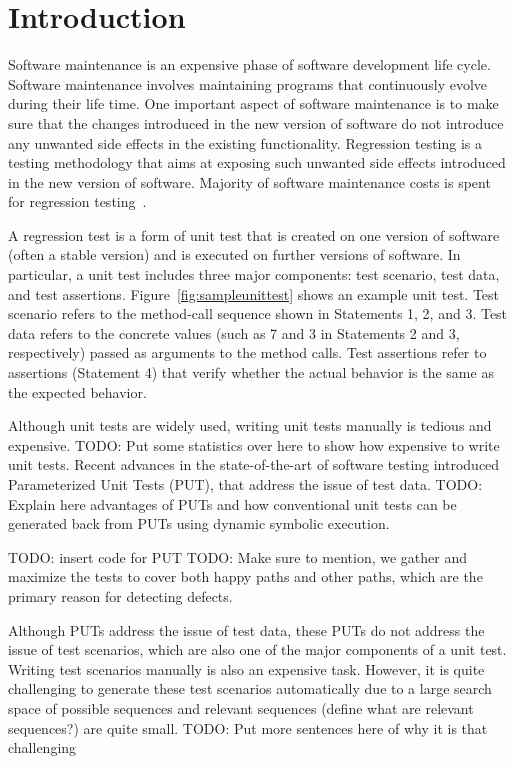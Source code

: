 \section{Introduction}
\label{sec:intro}

Software maintenance is an expensive phase of software development 
life cycle. Software maintenance involves maintaining programs that 
continuously evolve during their life time. One important aspect 
of software maintenance is to make sure that the changes introduced 
in the new version of software do not introduce any unwanted
side effects in the existing functionality. Regression testing is a testing 
methodology that aims at exposing such unwanted side effects introduced
in the new version of software. Majority of software
maintenance costs is spent for regression testing~\cite{}.

A regression test is a form of unit test that is created on one
version of software (often a stable version) and is executed 
on further versions of software. In particular, a unit test includes three 
major components: test scenario, test data, and test
assertions. Figure~\ref{fig:sampleunittest} shows an example unit test.
Test scenario refers to the method-call sequence shown in Statements
1, 2, and 3. Test data refers to the concrete values (such as 7 and 3
in Statements 2 and 3, respectively) passed as arguments to the method calls. 
Test assertions refer to assertions (Statement 4) that verify whether the actual
behavior is the same as the expected behavior.

Although unit tests are widely used, writing unit tests manually is tedious and expensive. TODO: Put
some statistics over here to show how expensive to write unit tests.
Recent advances in the state-of-the-art of software testing introduced Parameterized Unit Tests (PUT),
that address the issue of test data. TODO: Explain here advantages of PUTs and how conventional unit
tests can be generated back from PUTs using dynamic symbolic execution.

TODO: insert code for PUT
TODO: Make sure to mention, we gather and maximize the tests to cover both
happy paths and other paths, which are the primary reason for detecting defects.

Although PUTs address the issue of test data, these PUTs do not address the issue of test scenarios,
which are also one of the major components of a unit test. Writing test scenarios manually is also
an expensive task. However, it is quite challenging to generate these test scenarios automatically
due to a large search space of possible sequences and relevant sequences (define what are relevant
sequences?) are quite small. TODO: Put more sentences here of why it is that challenging

